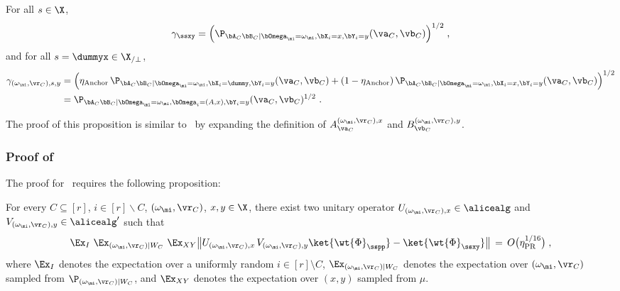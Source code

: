 \begin{proposition}
	\label{prop:gamma}
	For all $s \in \X$,
	\begin{equation*}
		\gamma_{\ssxy} = \Big( \P_{\bA_C \bB_C | \bOmega_\mi = \omega_\mi, \bX_i = x, \bY_i = y}(\va_C,\vb_C) \Big)^{1/2}\;,
	\end{equation*}
	and for all $s = \dummyx \in \X_{/\perp}$,
	\begin{align}
		\nonumber \gamma_{(\omega_{\mi}, \vr_C),s,y} &= \Big( \eta_{\text{Anchor}} \, \P_{\bA_C \bB_C | \bOmega_\mi = \omega_\mi, \bX_i = \dummy, \bY_i = y}(\va_C,\vb_C) + (1 - \eta_{\text{Anchor}}) \, \P_{\bA_C \bB_C  | \bOmega_\mi = \omega_\mi, \bX_i = x, \bY_i = y}(\va_C,\vb_C)\Big)^{1/2} \\
		&= \P_{\bA_C \bB_C | \bOmega_\mi = \omega_\mi, \bOmega_i = (A,x), \bY_i = y}(\va_C,\vb_C)^{1/2}~.\label{eq:gamma-def-3}
	\end{align}
\end{proposition}

The proof of this proposition is similar to~\cite[Proposition 4.9]{bavarianAnchoredParallelRepetition2021} by expanding the definition of $A^{(\omega_\mi, \vr_C),x}_{\va_C}$ and  $B^{(\omega_\mi, \vr_C),y}_{\vb_C}$. 

\subsubsection{Proof of }\label{sec:analysis}

The proof for~ requires the following proposition:
\begin{proposition}
	\label{prop:local_operators}
	For every $C\subseteq [r]$, $i\in[r] \backslash C$, $(\omega_{\mi}, \vr_C)$, $x,y\in \X$, there exist two unitary operator $U_{(\omega_{\mi}, \vr_C),x} \in \alicealg$ and $V_{(\omega_{\mi}, \vr_C),y} \in \alicealg'$ such that
	$$
	\Ex_I \,\, \Ex_{(\omega_{\mi}, \vr_C) | W_C} \,\, \Ex_{XY}  \big \| U_{(\omega_{\mi}, \vr_C),x} \, V_{(\omega_{\mi}, \vr_C),y} \ket{\wt{\Phi}_{\sspp}} - \ket{\wt{\Phi}_{\ssxy}} \big\| \,=\, O\big(\eta_{\text{PR}}^{1/16} \big)\;,
	$$
	where $\Ex_I$ denotes the expectation over a uniformly random $i \in [r] \setminus C$, $\Ex_{(\omega_{\mi}, \vr_C) | W_C}$ denotes the expectation over $(\omega_{\mi}, \vr_C)$ sampled from $\P_{(\omega_{\mi}, \vr_C) | W_C}$, and $\Ex_{XY}$ denotes the expectation over $(x,y)$ sampled from $\mu$. 
\end{proposition}

